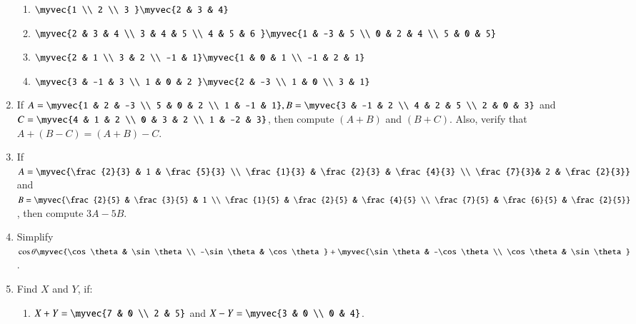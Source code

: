 \documentclass{article}
\theoremstyle{remark}
\begin{document}
\begin{enumerate}
\begin{enumerate}[label=(\roman*)]
\item $\myvec
{1 \\ 2 \\ 3 } \myvec
{2 & 3 & 4}$
\item $\myvec
{2 & 3 & 4 \\ 3 & 4 & 5 \\ 4 & 5 & 6 } \myvec
{1 & -3 & 5 \\ 0 & 2 & 4 \\ 5 & 0 & 5}$
\item  $\myvec
{2 & 1 \\ 3 & 2 \\ -1 & 1}\myvec
{1 & 0 & 1 \\ -1 & 2 & 1}$
\item $\myvec
{3 & -1 & 3 \\ 1 & 0 & 2 } \myvec
{2 & -3 \\ 1 & 0 \\ 3 & 1}$
\end{enumerate}
\item If $A=\myvec
{1 & 2 & -3 \\ 5 & 0 & 2 \\ 1 & -1 & 1}, B=\myvec
{3 & -1 & 2 \\ 4 & 2 & 5 \\ 2 & 0 & 3}$ and $C=\myvec
{4 & 1 & 2 \\ 0 & 3 & 2 \\ 1 & -2 & 3}$, then compute $(A+B)$ and $(B+C)$. Also, verify
that $A+(B-C)=(A+B)-C$.
\item If $A=\myvec
{\frac{2}{3} & 1 & \frac{5}{3} \\ \frac{1}{3} & \frac{2}{3} & \frac{4}{3} \\ \frac{7}{3}& 2 & \frac{2}{3}}$  and $B= \myvec
{\frac{2}{5} & \frac{3}{5} & 1 \\ \frac{1}{5} & \frac{2}{5} & \frac{4}{5} \\ \frac{7}{5} & \frac{6}{5} & \frac{2}{5}}$, then compute $3A-5B$.
\item Simplify $\cos \theta \myvec
{\cos \theta & \sin \theta \\ -\sin \theta & \cos \theta} + \myvec{\sin \theta & -\cos \theta \\ \cos \theta & \sin \theta}$.
\item Find $X$ and $Y$, if:
\begin{enumerate}[label=(\roman*)]
\item $X+Y= \myvec
{7 & 0 \\ 2 & 5}$  and $X-Y=\myvec
{3 & 0 \\ 0 & 4}$.

\end{enumerate}
\end{enumerate}
\end{document}
